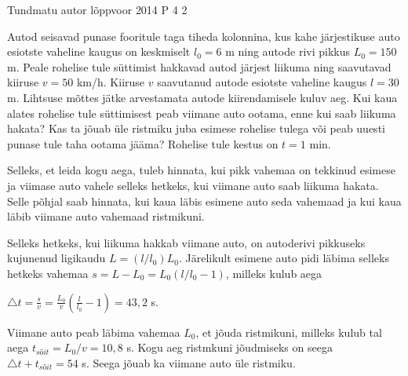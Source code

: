 {Tundmatu autor} %
{lõppvoor} %
{2014} %
{P 4} %
{2} %
{

\ifStatement
Autod seisavad punase fooritule taga tiheda kolonnina, kus kahe järjestikuse auto esiotste vaheline kaugus on keskmiselt $l_0 = 6$ m ning autode rivi pikkus $L_0 = 150$ m. Peale rohelise tule süttimist hakkavad autod järjest liikuma ning saavutavad kiiruse $v = 50$ km/h. Kiiruse $v$ saavutanud autode esiotste vaheline kaugus $l = 30$ m. Lihtsuse mõttes jätke arvestamata autode kiirendamisele kuluv aeg. Kui kaua alates rohelise tule süttimisest peab viimane auto ootama, enne kui saab liikuma hakata? Kas ta jõuab üle ristmiku juba esimese rohelise tulega või peab uuesti punase tule taha ootama jääma? Rohelise tule kestus on $t = 1$ min. 
\fi

\ifHint
Selleks, et leida kogu aega, tuleb hinnata, kui pikk vahemaa on tekkinud esimese ja viimase auto vahele selleks hetkeks, kui viimane auto saab liikuma hakata. Selle põhjal saab hinnata, kui kaua läbis esimene auto seda vahemaad ja kui kaua läbib viimane auto vahemaad ristmikuni.
\fi

\ifSolution
Selleks hetkeks, kui liikuma hakkab viimane auto, on autoderivi pikkuseks kujunenud ligikaudu $L = (l / l_0) L_0$. Järelikult esimene auto pidi läbima selleks hetkeks vahemaa $s = L - L_0 = L_0 (l/l_0 - 1)$, milleks kulub aega 
\begin{center}
$\triangle t = \frac{s}{v} = \frac{L_0}{v} (\frac{l}{l_0} - 1) = 43,2$ s.
\end{center}
Viimane auto peab läbima vahemaa $L_0$, et jõuda ristmikuni, milleks kulub tal aega $t_{sõit} = L_0 / v = 10,8$ s. Kogu aeg ristmkuni jõudmiseks on seega $\triangle t + t_{sõit} = 54$ s. Seega jõuab ka viimane auto üle ristmiku.
\fi
}